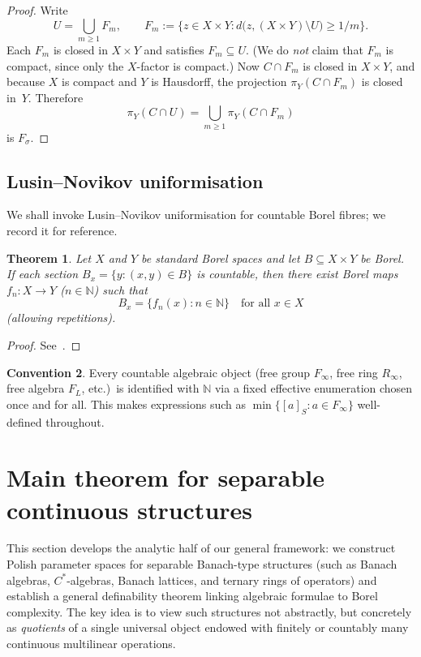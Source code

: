 \documentclass[12pt,fleqn,a4paper]{amsart}
\renewcommand{\ge}{\geqslant}
\numberwithin{equation}{section}
\newtheorem{theorem}{Theorem}[section]
\theoremstyle{definition}
\newtheorem{convention}[theorem]{Convention}
\newcommand{\N}{\mathbb{N}}
\begin{document}
\begin{proof}
Write
\[
U=\bigcup_{m\ge 1}F_m,
\qquad
F_m:=\bigl\{z\in X\times Y:d\bigl(z,(X\times Y)\setminus U\bigr)\ge 1/m\bigr\}.
\]
Each $F_m$ is closed in $X\times Y$ and satisfies $F_m\subseteq U$.
(We do \emph{not} claim that $F_m$ is compact, since only the $X$-factor is compact.)
Now $C\cap F_m$ is closed in $X\times Y$, and because $X$ is compact and $Y$ is
Hausdorff, the projection $\pi_Y(C\cap F_m)$ is closed in~$Y$.
Therefore
\[
\pi_Y(C\cap U)=\bigcup_{m\ge 1}\pi_Y(C\cap F_m)
\]
is $F_\sigma$.
\end{proof}


\subsection{Lusin--Novikov uniformisation}

We shall invoke Lusin--Novikov uniformisation for countable Borel fibres; we record it
for reference.

\begin{theorem}\label{thm:LN}
Let $X$ and $Y$ be standard Borel spaces and let $B\subseteq X\times Y$ be Borel.
If each section $B_x=\{y:(x,y)\in B\}$ is countable, then there exist Borel maps
$f_n:X\to Y$ ($n\in\N$) such that
\[
B_x=\{f_n(x):n\in\N\}
\quad\text{for all }x\in X
\]
(allowing repetitions).
\end{theorem}

\begin{proof}
See~\cite[Theorem~18.10]{Kechris}.
\end{proof}

\begin{convention}\label{conv:enumeration}
Every countable algebraic object (free group $F_\infty$, free ring $R_\infty$, free
algebra $F_L$, etc.)\ is identified with $\N$ via a fixed effective enumeration chosen
once and for all.
This makes expressions such as $\min\{[a]_S:a\in F_\infty\}$ well-defined throughout.
\end{convention}

\section{Main theorem for separable continuous structures}\label{sec:continuous}

This section develops the analytic half of our general framework:
we construct Polish parameter spaces for separable Banach-type structures
(such as Banach algebras, $C^*$-algebras, Banach lattices, and ternary rings of
operators) and establish a general definability theorem linking algebraic formulae
to Borel complexity.  The key idea is to view such structures not abstractly, but
concretely as \emph{quotients} of a single universal object endowed with
finitely or countably many continuous multilinear operations.
\end{document}
